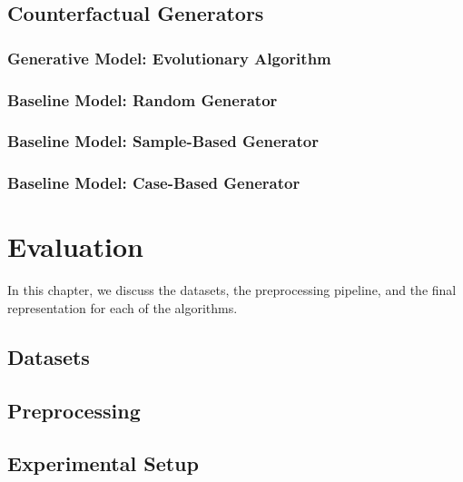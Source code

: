 \documentclass[12pt,a4paper]{report}
\begin{document}
\section{Counterfactual Generators}
\label{sec:model_generation}
\subsection{Generative Model: Evolutionary Algorithm}
\label{sec:model_evolutionary}


\subsection{Baseline Model: Random Generator}


\subsection{Baseline Model: Sample-Based Generator}


\subsection{Baseline Model: Case-Based Generator}



\chapter{Evaluation}
\label{ch:evaluation}
In this chapter, we discuss the datasets, the preprocessing pipeline, and the final representation for each of the algorithms.


\section{Datasets}
\label{sec:dataset_description}

% 
% 


\section{Preprocessing}
\label{sec:preprocessing}


\section{Experimental Setup}
\label{sec:experimental_setup}

\end{document}
